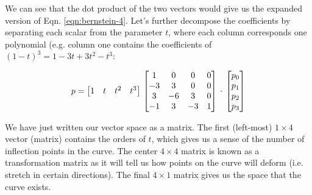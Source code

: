 \documentclass[12pt,letterpaper]{article}
\begin{document}
We can see that the dot product of the two vectors would give us the expanded version of Eqn. \ref{eqn:bernstein-4}. Let's further decompose the coefficients by separating each scalar from the parameter $t$, where each column corresponds one polynomial (e.g. column one contains the coefficients of $(1 - t)^{3} = 1 - 3t + 3t^{2} - t^{3}$:

\begin{equation}
    p = \begin{bmatrix} 1 & t & t^{2} & t^{3} \end{bmatrix} \\
    \begin{bmatrix} 1 & 0 & 0 & 0 \\ -3 & 3 & 0 & 0 \\ 3 & -6 & 3  & 0 \\ -1 & 3 & -3 & 1 \end{bmatrix} \\
    \cdot \\
    \begin{bmatrix} p_{0} \\ p_{1} \\ p_{2} \\ p_{3} \end{bmatrix}
\end{equation}

We have just written our vector space as a matrix. The first (left-most) $1 \times 4$ vector (matrix) contains the orders of $t$, which gives us a sense of the number of inflection points in the curve. The center $4 \times 4$ matrix is known as a transformation matrix as it will tell us how points on the curve will deform (i.e. stretch in certain directions). The final $4 \times 1$ matrix gives us the space that the curve exists. 
\end{document}
